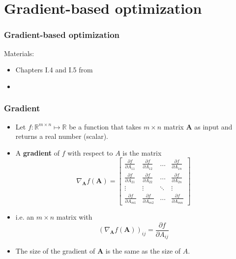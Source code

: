 \documentclass[notes]{beamer}          %
\newcommand{\vect}[1]{\bm{#1}}
\newcommand{\field}[1]{\mathbb{#1}}
\newcommand{\R}{\field{R}}
\newif\iffull
\begin{document}
\iffull
\begin{frame}
\frametitle{Trace}
    \begin{itemize}
        \item A {\bf trace} of a matrix is defined as
        $$Tr(\vect{A}) = \sum_{i} \vect{A}_{i,i} $$
        \item Expressions in terms of the trace operators allow to exploit many useful identities, e.g.
        $$Tr(\vect{A}\vect{B}\vect{C}) = Tr(\vect{B}\vect{C}\vect{A}) = Tr(\vect{C}\vect{A}\vect{B})$$
    \end{itemize}

\end{frame}
\fi

\fi %

\section{Gradient-based optimization}


\begin{frame}
\frametitle{Gradient-based optimization}
Materials:
\begin{itemize}
    \item Chapters I.4 and I.5 from \cite{deeplearning}
    \item \cite{linearalgebra}
\end{itemize}
\end{frame}

\begin{frame}
\frametitle{Gradient}
    \begin{itemize}
        \item Let $f: \R^{m \times n} \mapsto \R$ be a function that takes $m \times n$ matrix $\vect{A}$ as input and returns a real number (scalar).
        \item A {\bf gradient} of $f$ with respect to $A$ is the matrix
        $$
        \nabla_{\vect{A}} f(\vect{A}) =
        \begin{bmatrix}
         \frac{\partial f}{\partial A_{11}} & \frac{\partial f}{\partial A_{12}} & \ldots & \frac{\partial f}{\partial A_{1n}} \\
          \frac{\partial f}{\partial A_{21}} & \frac{\partial f}{\partial A_{22}} & \ldots & \frac{\partial f}{\partial A_{2n}} \\
          \vdots & \vdots & \ddots & \vdots \\
           \frac{\partial f}{\partial A_{m1}} & \frac{\partial f}{\partial A_{m2}} & \ldots & \frac{\partial f}{\partial A_{mn}}
        \end{bmatrix}
        $$
        \item i.e. an $m \times n$ matrix with  $$(\nabla_{\vect{A}} f(\vect{A}))_{ij} = \frac{\partial f}{\partial A_{ij}}  $$
        \item The size of the gradient of $\vect{A}$ is the same as the size of $A$.

    \end{itemize}
\end{frame}
\end{document}
